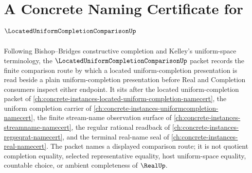 \chapter{A Concrete Naming Certificate for $\LocatedUniformCompletionComparisonUp$}
\label{ch:concrete-instances-located-uniform-completion-comparison-namecert}

Following Bishop--Bridges constructive completion and Kelley's uniform-space terminology, the $\LocatedUniformCompletionComparisonUp$ packet records the finite comparison route by which a located uniform-completion presentation is read beside a plain uniform-completion presentation before Real and Completion consumers inspect either endpoint. It sits after the located uniform-completion packet of \autoref{ch:concrete-instances-located-uniform-completion-namecert}, the uniform completion carrier of \autoref{ch:concrete-instances-uniformcompletion-namecert}, the finite stream-name observation surface of \autoref{ch:concrete-instances-streamname-namecert}, the regular rational readback of \autoref{ch:concrete-instances-regseqrat-namecert}, and the terminal real-name seal of \autoref{ch:concrete-instances-real-namecert}. The packet names a displayed comparison route; it is not quotient completion equality, selected representative equality, host uniform-space equality, countable choice, or ambient completeness of $\RealUp$.

